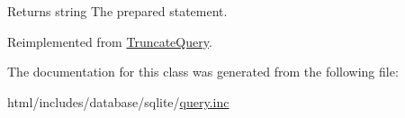 \begin{DoxyReturn}{Returns}
string The prepared statement. 
\end{DoxyReturn}


Reimplemented from \hyperlink{classTruncateQuery_a4a18f66831b99b10cccd74c617fa6723}{TruncateQuery}.

The documentation for this class was generated from the following file:\begin{DoxyCompactItemize}
\item 
html/includes/database/sqlite/\hyperlink{sqlite_2query_8inc}{query.inc}\end{DoxyCompactItemize}
